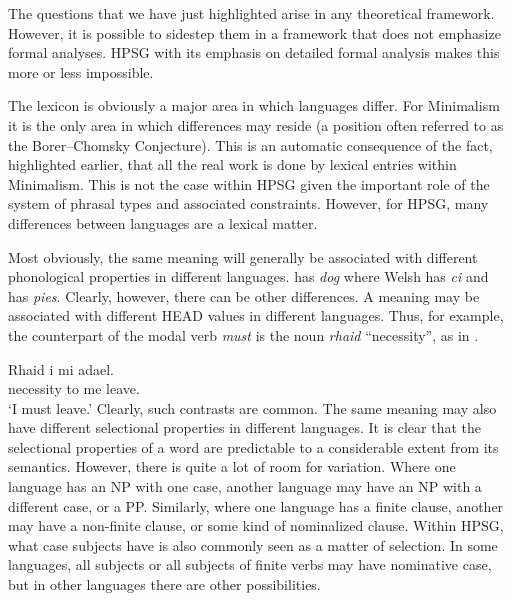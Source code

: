 \documentclass[output=paper]{langsci/langscibook}
\begin{document}
The questions that we have just highlighted arise in any theoretical framework.
However, it is possible to sidestep them in a framework that does not emphasize
formal analyses. \gls{HPSG} with its
emphasis on detailed formal analysis makes this more or less impossible.

The lexicon is obviously a major area in which languages differ. For Minimalism
it is the only area in which differences may reside (a position often referred
to as the Borer--Chomsky Conjecture). This is an
automatic consequence of the fact, highlighted earlier, that all the real work
is done by lexical entries within Minimalism. This is not the case within
\gls{HPSG} given the important role of the system of phrasal types and
associated constraints. However, for \gls{HPSG}, many differences between
languages are a lexical matter.\largerpage[1]

Most obviously, the same meaning will generally be associated with different
phonological properties in different languages.  has \emph{dog} where
Welsh has \emph{ci} and  has \emph{pies}. Clearly, however, there can be
other differences. A meaning may be associated with different HEAD values in
different languages. Thus, for example, the  counterpart of the
modal verb \emph{must} is the noun \emph{rhaid} \enquote{necessity}, as in
.

\ea\label{ex:key:4.15}
    \sn\gll Rhaid i mi adael.\\
            necessity to me leave.\Inf{}\\
    \glt    \enquote*{I must leave.}
\z
%
Clearly, such contrasts are common. The same meaning may also have different
selectional properties in different languages. It is clear that the selectional
properties of a word are predictable to a considerable extent from its
semantics. However, there is quite a lot of room for variation. Where one
language has an NP with one case, another language may have an NP with a
different case, or a PP. Similarly, where one language has a finite clause,
another may have a non-finite clause, or some kind of nominalized clause.
Within \gls{HPSG}, what case subjects have is also commonly seen as a matter of
selection. In some languages, all subjects or all subjects of finite verbs may
have nominative case, but in other languages there are other possibilities.
\end{document}

